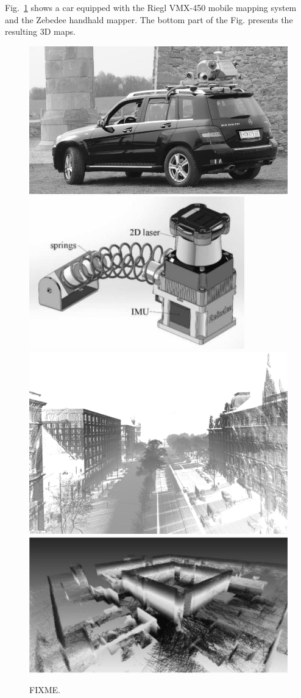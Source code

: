 \documentclass[twocolumn,oneside]{book}
\begin{document}
Fig.~\ref{fig:mm} shows a car equipped with the Riegl VMX-450 mobile
mapping system and the Zebedee handhald mapper. The bottom part of the
Fig. presents the resulting 3D maps.
%
\begin{figure}
  \centering
  \includegraphics[width=0.545\linewidth]{BOOKFIGS/riegl_car}
  \includegraphics[width=0.435\linewidth]{BOOKFIGS/zebedee}
  \includegraphics[width=0.95\linewidth]{BOOKFIGS/wien}
  \includegraphics[width=0.95\linewidth]{BOOKFIGS/zebedee_map}
  \caption{FIXME.}
  \label{fig:mm}
\end{figure}
\end{document}
